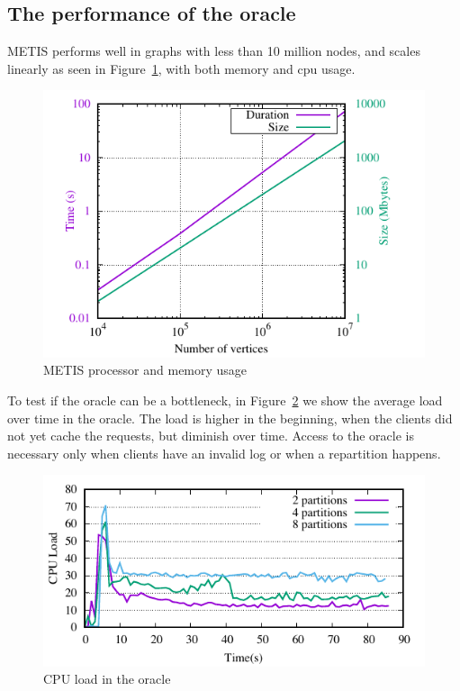 \subsection{The performance of the oracle}

METIS performs well in graphs with less than 10 million nodes, and scales linearly as seen in Figure~\ref{fig:metis_size_time}, with both memory and cpu usage.

\begin{figure}[ht!]
  \centering
    \includegraphics[width=\columnwidth]{figures/metis_size_time}
	\caption{METIS processor and memory usage}
	\label{fig:metis_size_time}
\end{figure}

To test if the oracle can be a bottleneck, in Figure~\ref{fig:cpu_oracle} we show the average load over time in the oracle.
The load is higher in the beginning, when the clients did not yet cache the requests, but diminish over time. Access to the
oracle is necessary only when clients have an invalid log or when a repartition happens.

\begin{figure}[ht]
	\includegraphics{figures/experiments/oracle-load}
	\caption{CPU load in the oracle}
	\label{fig:cpu_oracle}
\end{figure}


